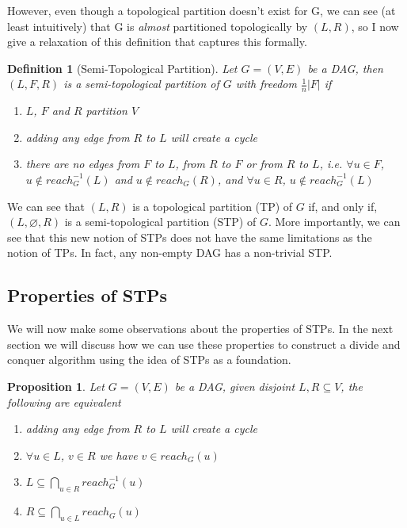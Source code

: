 \documentclass{report}
\newtheorem{proposition}[theorem]{Proposition}
\newtheorem{definition}[theorem]{Definition}
\begin{document}
However, even though a topological partition doesn't exist for G, we can see (at least intuitively) that G is \textit{almost} partitioned topologically by $(L,R)$, so I now give a relaxation of this definition that captures this formally.

\begin{definition}[Semi-Topological Partition]
Let $G=(V,E)$ be a DAG, then $(L,F,R)$ is a \textit{semi-topological partition} of $G$ with \textit{freedom} $\frac{1}{n} \vert F \vert$ if
\begin{enumerate}
\item $L$, $F$ and $R$ partition $V$
\item adding any edge from $R$ to $L$ will create a cycle
\item there are no edges from $F$ to $L$, from $R$ to $F$ or from $R$ to $L$, i.e. $\forall u \in F$, $u \notin reach_{G}^{-1}(L)$ and $u \notin reach_{G}(R)$, and $\forall u \in R$, $u \notin reach_{G}^{-1}(L)$ 
\end{enumerate}
\end{definition}

We can see that $(L,R)$ is a topological partition (TP) of $G$ if, and only if, $(L,\varnothing,R)$ is a semi-topological partition (STP) of $G$. More importantly, we can see that this new notion of STPs does not have the same limitations as the notion of TPs. In fact, any non-empty DAG has a non-trivial STP.

\subsection{Properties of STPs}

We will now make some observations about the properties of STPs. In the next section we will discuss how we can use these properties to construct a divide and conquer algorithm using the idea of STPs as a foundation.

\begin{proposition}
Let $G=(V,E)$ be a DAG, given disjoint $L,R \subseteq V$, the following are equivalent
\begin{enumerate}
\item adding any edge from $R$ to $L$ will create a cycle
\item $\forall u \in L$, $v \in R$ we have $v \in reach_{G}(u)$
\item $L \subseteq \bigcap_{u \in R} reach_{G}^{-1}(u)$
\item $R \subseteq \bigcap_{u \in L} reach_{G}(u)$
\end{enumerate}
\end{proposition}
\end{document}
